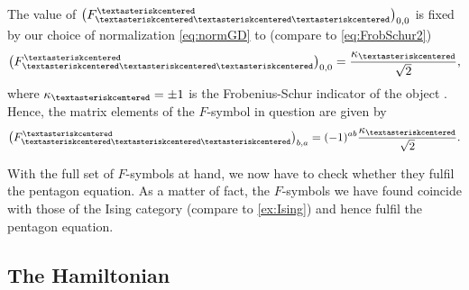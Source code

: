 {The value of $\left(F_{\mathrm{\textasteriskcentered}\mathrm{\textasteriskcentered}\mathrm{\textasteriskcentered}}^\mathrm{\textasteriskcentered}\right)_{0,0}$ is fixed by our choice of normalization \cref{eq:normGD} to (compare to \cref{eq:FrobSchur2})
	\begin{equation}
		\left(F_{\mathrm{\textasteriskcentered}\mathrm{\textasteriskcentered}\mathrm{\textasteriskcentered}}^\mathrm{\textasteriskcentered}\right)_{0,0}=\frac{\kappa_\mathrm{\textasteriskcentered}}{\sqrt{2}},
	\end{equation}
where $\kappa_\mathrm{\textasteriskcentered}=\pm 1$ is the Frobenius-Schur indicator of the object \textasteriskcentered. Hence, the matrix elements of the $F$-symbol in question are given by
	\begin{equation}
		\left(F_{\mathrm{\textasteriskcentered}\mathrm{\textasteriskcentered}\mathrm{\textasteriskcentered}}^\mathrm{\textasteriskcentered}\right)_{b,a}=(-1)^{ab}\frac{\kappa_\mathrm{\textasteriskcentered}}{\sqrt{2}}.
	\end{equation}

With the full set of $F$-symbols at hand, we now have to check whether they fulfil the pentagon equation. As a matter of fact, the $F$-symbols we have found coincide with those of the Ising category (compare to \cref{ex:Ising}) and hence fulfil the pentagon equation.

\subsection*{The Hamiltonian}

}
